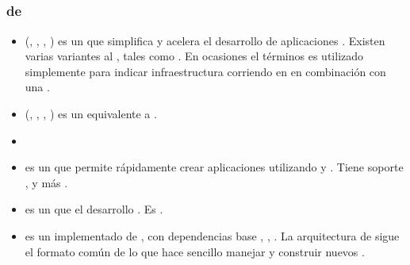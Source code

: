 \subsection{\fullstackAS \javaScriptNAME \frameworksPC}
\label{cap:estadoArte:section:fullstack_javaScript_framework}

\subsubsection{\stackAS de \javaScriptNAME \frameworksPC}
	\begin{itemize}
		\item
			\textbf{\meanstackNAME} (\mongodbNAME, \expressjsNAME, \angularjsNAME, \nodejsNAME) es un \fullstackAS \javaScriptNAME \frameworkPC que simplifica y acelera el desarrollo de aplicaciones \webINT \cite{online_mean_io}. Existen varias variantes al \stackAS \meanstackNAME, tales como \meenstackNAME. En ocasiones el términos es utilizado simplemente para indicar infraestructura corriendo en \nodejsNAME en combinación con una \dataBaseDB \nosqlNAME.
		\item
			\textbf{\meenstackNAME} \cite{online_meen_github}(\mongodbNAME, \emberjsNAME, \expressjsNAME, \nodejsNAME) es un \fullstackAS \javaScriptNAME \frameworkPC equivalente a \meanstackNAMEref.
		\item
			\textbf{\socketStreamNAME}\cite{online_socketstream_official_org}
		\item
			\textbf{\saneNAME} es un \fullstackAS \javaScriptNAME que permite rápidamente crear aplicaciones \webINT \productionReadyPC utilizando \sailsNAME y \emberjsNAME. Tiene soporte \dockerNAME, \generatorsAS y más \cite{online_sanestack_official_site}.
		\item
			\textbf{\cokeNAME} es un \nodejsNAME \mvcAS \frameworkPC \lightweightPL que \speedupCPT el desarrollo \webINT. Es \modularizedAS \cite{online_cokejs_official_site}. 
		\item
			\textbf{\sleekjsNAME} es un \frameworkPC \mvcAS implementado de \nodejsNAME, \builtINPL con dependencias base \handlebarsNAMEref, \expressjsNAMEref, \mongooseNAME. La arquitectura de \sleekjsNAME sigue el formato común de \mvcAS lo que hace sencillo manejar y construir nuevos \websitesINT\cite{online_sleekjs_official_site}.

\end{itemize}
